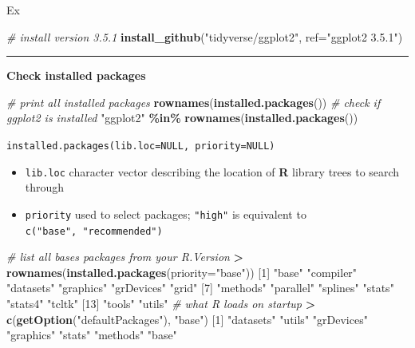 \documentclass[
  a4paper,
  twoside,
  openright]{book}
\newenvironment{Shaded}{\begin{snugshade}}{\end{snugshade}}
\newcommand{\AttributeTok}[1]{\textcolor[rgb]{0.13,0.29,0.53}{#1}}
\newcommand{\CommentTok}[1]{\textcolor[rgb]{0.56,0.35,0.01}{\textit{#1}}}
\newcommand{\DecValTok}[1]{\textcolor[rgb]{0.00,0.00,0.81}{#1}}
\newcommand{\FunctionTok}[1]{\textcolor[rgb]{0.13,0.29,0.53}{\textbf{#1}}}
\newcommand{\NormalTok}[1]{#1}
\newcommand{\SpecialCharTok}[1]{\textcolor[rgb]{0.81,0.36,0.00}{\textbf{#1}}}
\newcommand{\StringTok}[1]{\textcolor[rgb]{0.31,0.60,0.02}{#1}}
\providecommand{\tightlist}{%
  \setlength{\itemsep}{0pt}\setlength{\parskip}{0pt}}
\theoremstyle{definition}
\theoremstyle{definition}
\theoremstyle{definition}
\theoremstyle{definition}
\theoremstyle{remark}
\begin{document}
Ex

\begin{Shaded}
\begin{Highlighting}[]
\CommentTok{\# install version 3.5.1}
\FunctionTok{install\_github}\NormalTok{(}\StringTok{"tidyverse/ggplot2"}\NormalTok{, }\AttributeTok{ref=}\StringTok{"ggplot2 3.5.1"}\NormalTok{)}
\end{Highlighting}
\end{Shaded}

\begin{center}\rule{0.5\linewidth}{0.5pt}\end{center}

\textbf{Check installed packages}

\begin{Shaded}
\begin{Highlighting}[]
\CommentTok{\# print all installed packages}
\FunctionTok{rownames}\NormalTok{(}\FunctionTok{installed.packages}\NormalTok{())}
\CommentTok{\# check if \textasciigrave{}ggplot2\textasciigrave{} is installed}
\StringTok{"ggplot2"} \SpecialCharTok{\%in\%} \FunctionTok{rownames}\NormalTok{(}\FunctionTok{installed.packages}\NormalTok{())}
\end{Highlighting}
\end{Shaded}

\texttt{installed.packages(lib.loc=NULL,\ priority=NULL)}

\begin{itemize}
\tightlist
\item
  \texttt{lib.loc} character vector describing the location of \textbf{R} library trees to search through
\item
  \texttt{priority} used to select packages; \texttt{"high"} is equivalent to \texttt{c("base",\ "recommended")}
\end{itemize}

\begin{Shaded}
\begin{Highlighting}[]
\CommentTok{\# list all bases packages from your \textasciigrave{}R.Version\textasciigrave{}}
\SpecialCharTok{\textgreater{}} \FunctionTok{rownames}\NormalTok{(}\FunctionTok{installed.packages}\NormalTok{(}\AttributeTok{priority=}\StringTok{"base"}\NormalTok{))}
\NormalTok{ [}\DecValTok{1}\NormalTok{] }\StringTok{"base"}      \StringTok{"compiler"}  \StringTok{"datasets"}  \StringTok{"graphics"}  \StringTok{"grDevices"} \StringTok{"grid"}     
\NormalTok{ [}\DecValTok{7}\NormalTok{] }\StringTok{"methods"}   \StringTok{"parallel"}  \StringTok{"splines"}   \StringTok{"stats"}     \StringTok{"stats4"}    \StringTok{"tcltk"}    
\NormalTok{[}\DecValTok{13}\NormalTok{] }\StringTok{"tools"}     \StringTok{"utils"} 
\CommentTok{\#  what R loads on startup}
\SpecialCharTok{\textgreater{}} \FunctionTok{c}\NormalTok{(}\FunctionTok{getOption}\NormalTok{(}\StringTok{"defaultPackages"}\NormalTok{), }\StringTok{"base"}\NormalTok{)}
\NormalTok{[}\DecValTok{1}\NormalTok{] }\StringTok{"datasets"}  \StringTok{"utils"}     \StringTok{"grDevices"} \StringTok{"graphics"}  \StringTok{"stats"}     \StringTok{"methods"}   \StringTok{"base"}     
\end{Highlighting}
\end{Shaded}
\end{document}
